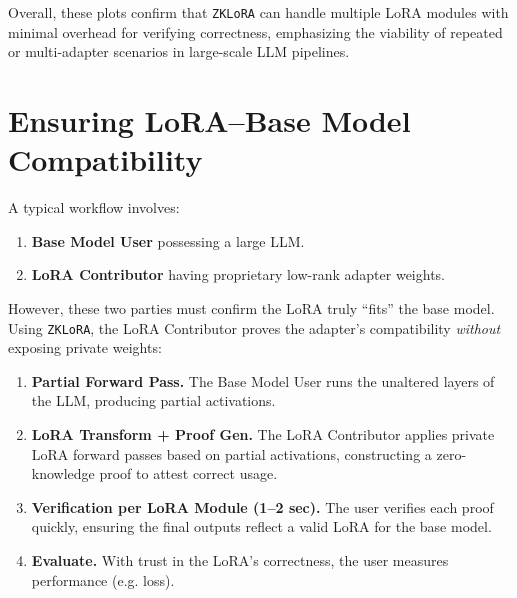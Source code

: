 \documentclass[11pt]{article}
\begin{document}
Overall, these plots confirm that \texttt{ZKLoRA} can handle multiple LoRA modules with minimal overhead for verifying correctness, emphasizing the viability of repeated or multi-adapter scenarios in large-scale LLM pipelines.

\section{Ensuring LoRA–Base Model Compatibility}

A typical workflow involves:
\begin{enumerate}
    \item \textbf{Base Model User} possessing a large LLM. 
    \item \textbf{LoRA Contributor} having proprietary low-rank adapter weights. 
\end{enumerate}
However, these two parties must confirm the LoRA truly “fits” the base model. Using \texttt{ZKLoRA}, the LoRA Contributor proves the adapter’s compatibility \emph{without} exposing private weights:

\begin{enumerate}
    \item \textbf{Partial Forward Pass.}
    The Base Model User runs the unaltered layers of the LLM, producing partial activations.

    \item \textbf{LoRA Transform + Proof Gen.}
    The LoRA Contributor applies private LoRA forward passes based on partial activations, constructing a zero-knowledge proof to attest correct usage.

    \item \textbf{Verification per LoRA Module (1--2 sec).}
    The user verifies each proof quickly, ensuring the final outputs reflect a valid LoRA for the base model.

    \item \textbf{Evaluate.}
    With trust in the LoRA’s correctness, the user measures performance (e.g. loss).
\end{enumerate}
\end{document}
